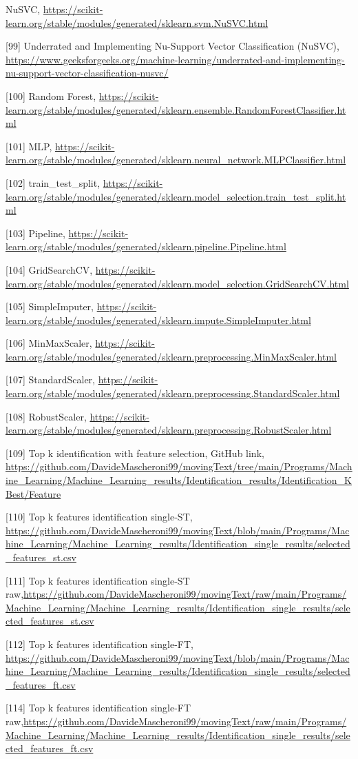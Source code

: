 \documentclass{article}
\begin{document}
\begin{raggedright}
[98] NuSVC, \url{https://scikit-learn.org/stable/modules/generated/sklearn.svm.NuSVC.html}

[99] Underrated and Implementing Nu-Support Vector Classification (NuSVC), \url{https://www.geeksforgeeks.org/machine-learning/underrated-and-implementing-nu-support-vector-classification-nusvc/}

[100] Random Forest, \url{https://scikit-learn.org/stable/modules/generated/sklearn.ensemble.RandomForestClassifier.html}

[101] MLP, \url{https://scikit-learn.org/stable/modules/generated/sklearn.neural_network.MLPClassifier.html}

[102] train\_test\_split, \url{https://scikit-learn.org/stable/modules/generated/sklearn.model_selection.train_test_split.html}

[103] Pipeline, \url{https://scikit-learn.org/stable/modules/generated/sklearn.pipeline.Pipeline.html}

[104] GridSearchCV, \url{https://scikit-learn.org/stable/modules/generated/sklearn.model_selection.GridSearchCV.html}

[105] SimpleImputer, \url{https://scikit-learn.org/stable/modules/generated/sklearn.impute.SimpleImputer.html}

[106] MinMaxScaler, \url{https://scikit-learn.org/stable/modules/generated/sklearn.preprocessing.MinMaxScaler.html}

[107] StandardScaler, \url{https://scikit-learn.org/stable/modules/generated/sklearn.preprocessing.StandardScaler.html}

[108] RobustScaler, \url{https://scikit-learn.org/stable/modules/generated/sklearn.preprocessing.RobustScaler.html}

[109] Top k identification with feature selection, GitHub link, \url{https://github.com/DavideMascheroni99/movingText/tree/main/Programs/Machine_Learning/Machine_Learning_results/Identification_results/Identification_KBest/Feature}

[110] Top k features identification single-ST, \url{https://github.com/DavideMascheroni99/movingText/blob/main/Programs/Machine_Learning/Machine_Learning_results/Identification_single_results/selected_features_st.csv}

[111] Top k features identification single-ST raw,\url{https://github.com/DavideMascheroni99/movingText/raw/main/Programs/Machine_Learning/Machine_Learning_results/Identification_single_results/selected_features_st.csv}

[112] Top k features identification single-FT, \url{https://github.com/DavideMascheroni99/movingText/blob/main/Programs/Machine_Learning/Machine_Learning_results/Identification_single_results/selected_features_ft.csv}

[114] Top k features identification single-FT raw,\url{https://github.com/DavideMascheroni99/movingText/raw/main/Programs/Machine_Learning/Machine_Learning_results/Identification_single_results/selected_features_ft.csv}


\end{raggedright}
\end{document}
